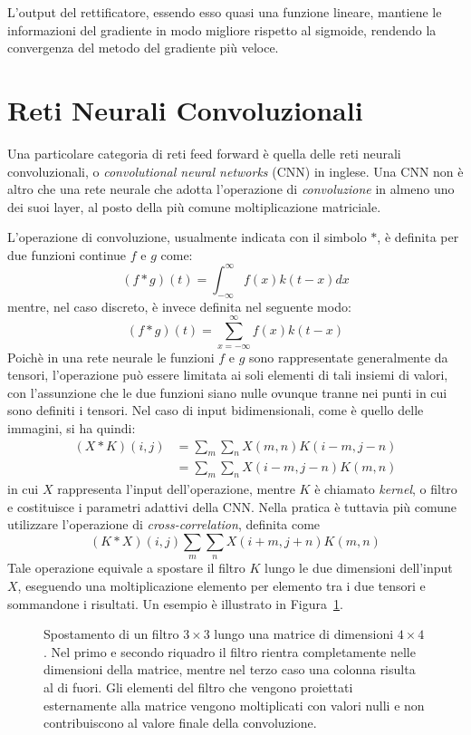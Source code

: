 L'output del rettificatore, essendo esso quasi una funzione lineare, mantiene
le informazioni del gradiente in modo migliore rispetto al sigmoide,
rendendo la convergenza del metodo del gradiente più veloce.
\section{Reti Neurali Convoluzionali}
Una particolare categoria di reti feed forward è quella delle reti neurali
convoluzionali, o \emph{convolutional neural networks} (CNN) in inglese. Una
CNN non è altro che una rete neurale che adotta l'operazione di
\emph{convoluzione} in almeno uno dei suoi layer, al posto della più comune
moltiplicazione matriciale.

L'operazione di convoluzione, usualmente indicata con il simbolo $*$, è
definita per due funzioni continue $f$ e $g$ come:
\[
(f * g)(t) = \int_{-\infty}^\infty{f(x)k(t - x)dx}
\]
mentre, nel caso discreto, è invece definita nel seguente modo:
\[
(f * g)(t) = \sum_{x = -\infty}^\infty{f(x)k(t - x)}
\]
Poichè in una rete neurale le funzioni $f$ e $g$ sono rappresentate
generalmente da tensori, l'operazione può essere limitata ai soli elementi di
tali insiemi di valori, con l'assunzione che le due funzioni siano nulle
ovunque tranne nei punti in cui sono definiti i tensori. Nel caso di input
bidimensionali, come è quello delle immagini, si ha quindi:
\begin{align*}
(X * K)(i,j) &= \sum_m{\sum_n{X(m,n) K(i - m, j - n)}} \\
             &= \sum_m{\sum_n{X(i - m, j - n) K(m, n)}}
\end{align*}
in cui $X$ rappresenta l'input dell'operazione, mentre $K$ è chiamato
\emph{kernel}, o filtro e costituisce i parametri adattivi della CNN\@. Nella
pratica è tuttavia più comune utilizzare l'operazione di
\emph{cross-correlation}, definita come
\[ (K * X)(i, j) \sum_m{\sum_n{X(i + m, j + n) K(m, n)}} \]
Tale operazione equivale a spostare il filtro $K$ lungo le due dimensioni
dell'input $X$, eseguendo una moltiplicazione elemento per elemento tra i due
tensori e sommandone i risultati. Un esempio è illustrato in
Figura~\ref{fig:conv}.
\begin{figure}[!htp]
  \caption{%
    Spostamento di un filtro $3\times3$ lungo una matrice di dimensioni
    $4\times4$. Nel primo e secondo riquadro il filtro rientra completamente
    nelle dimensioni della matrice, mentre nel terzo caso una colonna risulta
    al di fuori. Gli elementi del filtro che vengono proiettati esternamente
    alla matrice vengono moltiplicati con valori nulli e non contribuiscono al
    valore finale della convoluzione.
  }%
  \label{fig:conv}
\end{figure}
